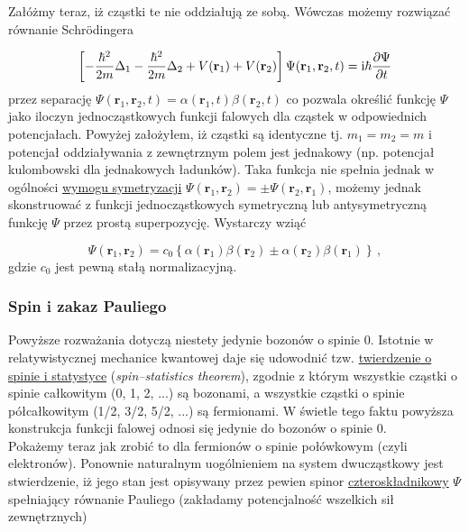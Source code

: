 \documentclass{myclass}
\begin{document}
Załóżmy teraz, iż cząstki te nie oddziałują ze sobą. Wówczas możemy rozwiązać równanie
Schr{\"o}dingera

\begin{equation*}
\left[-\frac{\hbar^2}{2m}\Delta_1-\frac{\hbar^2}{2m}\Delta_2+V(\mathbf{r}_1)+V(\mathbf{r}_2)\right]\Psi(\mathbf{r}_1,\mathbf{r}_2,t)=\mathrm{i}\hbar\pdv{\Psi}{t}
\end{equation*}
przez separację \(\Psi(\mathbf{r}_1,\mathbf{r}_2,t)=\alpha(\mathbf{r}_1,t)\beta(\mathbf{r}_2,t)\) co
pozwala określić funkcję \(\Psi\) jako iloczyn jednocząstkowych funkcji falowych dla cząstek w
odpowiednich potencjałach. Powyżej założyłem, iż cząstki są identyczne tj. \(m_1=m_2=m\) i potencjał
oddziaływania z zewnętrznym polem jest jednakowy (np. potencjał kulombowski dla jednakowych
ładunków). Taka funkcja nie spełnia jednak w ogólności \underline{wymogu symetryzacji}
\(\Psi(\mathbf{r}_1,\mathbf{r}_2)=\pm\Psi(\mathbf{r}_2,\mathbf{r}_1)\), możemy jednak skonstruować z
funkcji jednocząstkowych symetryczną lub antysymetryczną funkcję \(\Psi\) przez prostą superpozycję.
Wystarczy wziąć

\begin{equation*}
\Psi(\mathbf{r}_1,\mathbf{r}_2)=c_0\left\{\alpha(\mathbf{r}_1)\beta(\mathbf{r}_2)\pm\alpha(\mathbf{r}_2)\beta(\mathbf{r}_1)\right\}\,,
\end{equation*}
gdzie \(c_0\) jest pewną stałą normalizacyjną.

\subsubsection{Spin i zakaz Pauliego}

Powyższe rozważania dotyczą niestety jedynie bozonów o spinie 0. Istotnie w relatywistycznej
mechanice kwantowej daje się udowodnić tzw. \underline{twierdzenie o spinie i statystyce}
(\textit{spin--statistics theorem}), zgodnie z którym wszystkie cząstki o spinie całkowitym (0, 1,
2, ...) są bozonami, a wszystkie cząstki o spinie półcałkowitym (1/2, 3/2, 5/2, ...) są fermionami.
W świetle tego faktu powyższa konstrukcja funkcji falowej odnosi się jedynie do bozonów o spinie
0.\\

Pokażemy teraz jak zrobić to dla fermionów o spinie połówkowym (czyli elektronów). Ponownie
naturalnym uogólnieniem na system dwucząstkowy jest stwierdzenie, iż jego stan jest opisywany przez
pewien spinor \underline{czteroskładnikowy} \(\mathsf{\Psi}\) spełniający równanie Pauliego
(zakładamy potencjalność wszelkich sił zewnętrznych)
\end{document}
